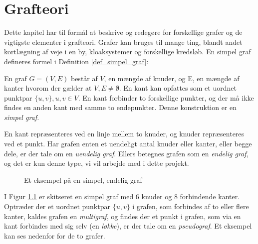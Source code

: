 \chapter{Grafteori}
\usetikzlibrary{arrows, automata}

Dette kapitel har til formål at beskrive og redegøre for forskellige grafer og de vigtigste elementer i grafteori. 
Grafer kan bruges til mange ting, blandt andet kortlægning af veje i en by, kloaksystemer og forskellige kredsløb.
En simpel graf defineres formel i Definition \ref{def_simpel_graf}:


\begin{defn}
En graf $G = (V, E)$ består af $V$, en mængde af knuder, og E, en mængde af kanter hvorom der gælder at $V, E \neq \emptyset$. En kant kan opfattes som et uordnet punktpar 
$\lbrace u,v \rbrace , u,v \in V$.
En kant forbinder to forskellige punkter, og der må ikke findes en anden kant med samme to endepunkter. Denne konstruktion er en \it{simpel graf}.
\label{def_simpel_graf}
\end{defn}


\noindent En kant repræsenteres ved en linje mellem to knuder, og knuder repræsenteres ved et punkt. Har grafen enten et uendeligt antal knuder eller kanter, eller begge dele, er der tale om en \textit{uendelig graf}. Ellers betegnes grafen som en \textit{endelig graf}, og det er kun denne type, vi vil arbejde med i dette projekt.


\begin{figure}[h]
\centering
{}
\caption{Et eksempel på en simpel, endelig graf} \label{simpel_graf}
\end{figure}


\noindent I Figur \ref{simpel_graf} er skitseret en simpel graf med $6$ knuder og $8$ forbindende kanter. \\ 

\noindent Optræder der et uordnet punktpar $\lbrace u,v \rbrace$ i grafen, som forbindes af to eller flere kanter, kaldes grafen en \textit{multigraf}, og findes der et punkt i grafen, som via en kant forbindes med sig selv (en \textit{løkke}), er der tale om en \textit{pseudograf}. Et eksempel kan ses nedenfor for de to grafer.

